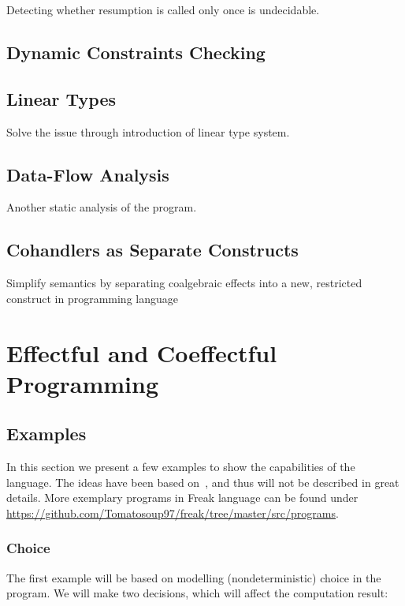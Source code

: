 \documentclass[declaration,shortabstract]{iithesis}
\theoremstyle{definition} \newtheorem{definition}{Definition}[chapter]
\theoremstyle{remark} \newtheorem{remark}[definition]{Observation}
\theoremstyle{plain} \newtheorem{theorem}[definition]{Theorem}
\theoremstyle{plain} \newtheorem{lemma}[definition]{Lemma}
\begin{document}
Detecting whether resumption is called only once is undecidable.

\section{Dynamic Constraints Checking}

\section{Linear Types}

Solve the issue through introduction of linear type system.

\section{Data-Flow Analysis}

Another static analysis of the program.

\section{Cohandlers as Separate Constructs}

Simplify semantics by separating coalgebraic effects into a new, restricted
construct in programming language

\chapter{Effectful and Coeffectful Programming}
\section{Examples}\label{sec:examples}

    In this section we present a few examples to show the capabilities of the language.
    The ideas have been based on~\cite{programming-in-eff}, and thus will not be
    described in great details. More exemplary programs in Freak language can
    be found under \\ \href{https://github.com/Tomatosoup97/freak/tree/master/src/programs}{\underline{https://github.com/Tomatosoup97/freak/tree/master/src/programs}}.

    \subsection{Choice}\label{sec:choice-example}

    The first example will be based on modelling (nondeterministic) choice
    in the program. We will make two decisions, which will affect the computation
    result:
\end{document}

